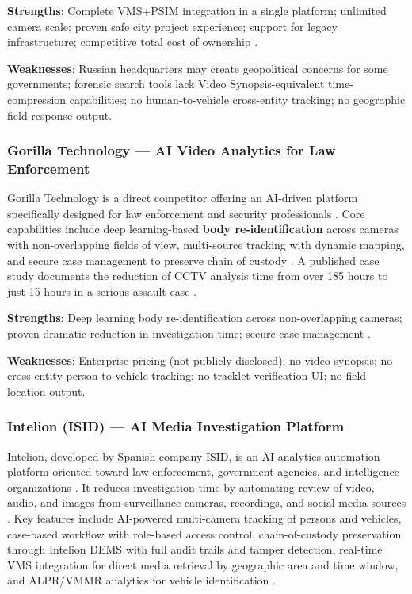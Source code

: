 \textbf{Strengths}: Complete VMS+PSIM integration in a single platform; unlimited camera scale; proven safe city project experience; support for legacy infrastructure; competitive total cost of ownership \cite{axxonsoft_website}.

\textbf{Weaknesses}: Russian headquarters may create geopolitical concerns for some governments; forensic search tools lack Video Synopsis-equivalent time-compression capabilities; no human-to-vehicle cross-entity tracking; no geographic field-response output.

\subsubsection{Gorilla Technology — AI Video Analytics for Law Enforcement}

Gorilla Technology is a direct competitor offering an AI-driven platform specifically designed for law enforcement and security professionals \cite{gorilla_law_enforcement}. Core capabilities include deep learning-based \textbf{body re-identification} across cameras with non-overlapping fields of view, multi-source tracking with dynamic mapping, and secure case management to preserve chain of custody \cite{gorilla_law_enforcement, gorilla_faster_video}. A published case study documents the reduction of CCTV analysis time from over 185 hours to just 15 hours in a serious assault case \cite{gorilla_faster_video}.

\textbf{Strengths}: Deep learning body re-identification across non-overlapping cameras; proven dramatic reduction in investigation time; secure case management \cite{gorilla_law_enforcement, gorilla_faster_video}.

\textbf{Weaknesses}: Enterprise pricing (not publicly disclosed); no video synopsis; no cross-entity person-to-vehicle tracking; no tracklet verification UI; no field location output.

\subsubsection{Intelion (ISID) — AI Media Investigation Platform}

Intelion, developed by Spanish company ISID, is an AI analytics automation platform oriented toward law enforcement, government agencies, and intelligence organizations \cite{intelion_youtube, intelion_forensic}. It reduces investigation time by automating review of video, audio, and images from surveillance cameras, recordings, and social media sources \cite{intelion_youtube}. Key features include AI-powered multi-camera tracking of persons and vehicles, case-based workflow with role-based access control, chain-of-custody preservation through Intelion DEMS with full audit trails and tamper detection, real-time VMS integration for direct media retrieval by geographic area and time window, and ALPR/VMMR analytics for vehicle identification \cite{intelion_tecnosec, intelion_dems}.

